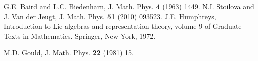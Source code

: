 \documentclass[12pt]{article}
\begin{document}
\begin{thebibliography}{10}
 G.E. Baird and L.C. Biedenharn, J. Math. Phys. {\bf 4} (1963) 1449.
%  
%  
% 
 N.I. Stoilova and J. Van der Jeugt, J. Math. Phys. {\bf 51} (2010) 093523.
% 
 J.E. Humphreys, Introduction to Lie algebras and representation theory, volume 9 of Graduate Texts in Mathematics. Springer, New York, 1972.


% 
% 
 M.D. Gould, J. Math. Phys. {\bf 22} (1981) 15.


\end{thebibliography}
\end{document}
